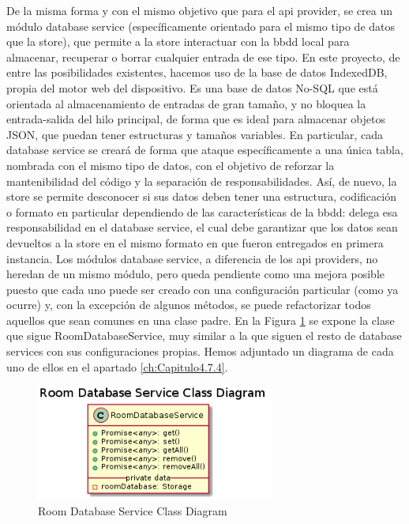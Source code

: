 \vspace{1cm}

De la misma forma y con el mismo objetivo que para el api provider, se crea un módulo database service (específicamente orientado para el mismo tipo de datos que la store), que permite a la store interactuar con la \gls{bbdd} local para almacenar, recuperar o borrar cualquier entrada de ese tipo. En este proyecto, de entre las posibilidades existentes, hacemos uso de la base de datos IndexedDB, propia del motor web del dispositivo. Es una base de datos No-SQL que está orientada al almacenamiento de entradas de gran tamaño, y no bloquea la entrada-salida del hilo principal, de forma que es ideal para almacenar objetos JSON, que puedan tener estructuras y tamaños variables. En particular, cada database service se creará de forma que ataque específicamente a una única tabla, nombrada con el mismo tipo de datos, con el objetivo de reforzar la mantenibilidad del código y la separación de responsabilidades. Así, de nuevo, la store se permite desconocer si sus datos deben tener una estructura, codificación o formato en particular dependiendo de las características de la \gls{bbdd}: delega esa responsabilidad en el database service, el cual debe garantizar que los datos sean devueltos a la store en el mismo formato en que fueron entregados en primera instancia. 
Los módulos database service, a diferencia de los api providers, no heredan de un mismo módulo, pero queda pendiente como una mejora posible puesto que cada uno puede ser creado con una configuración particular (como ya ocurre) y, con la excepción de algunos métodos, se puede refactorizar todos aquellos que sean comunes en una clase padre. En la Figura \ref{fig:database-service} se expone la clase que sigue RoomDatabaseService, muy similar a la que siguen el resto de database services con sus configuraciones propias. Hemos adjuntado un diagrama de cada uno de ellos en el apartado \ref{ch:Capitulo4.7.4}.


\begin{figure}[hbt!]
\centering
\includegraphics[height=1.5in]{figures/diagrams/front/architecture/database-service.png}
\caption[app-data]{Room Database Service Class Diagram\footnotemark}
\label{fig:database-service}
\end{figure}

